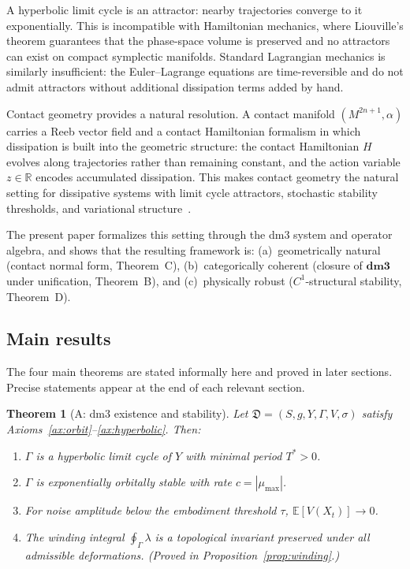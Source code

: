 \documentclass[12pt, oneside]{book}
\theoremstyle{plain}
\newtheorem{theorem}{Theorem}[section]
\theoremstyle{definition}
\theoremstyle{remark}
\newcommand{\R}{\mathbb{R}}
\newcommand{\dm}{\mathfrak{D}}
\newcommand{\dmcat}{\mathbf{dm3}}
\newcommand{\Orb}{\Gamma}
\newcommand{\abs}[1]{\left|#1\right|}
\begin{document}
A hyperbolic limit cycle is an attractor: nearby trajectories converge to it
exponentially. This is incompatible with Hamiltonian mechanics, where
Liouville's theorem guarantees that the phase-space volume is preserved and
no attractors can exist on compact symplectic manifolds. Standard Lagrangian
mechanics is similarly insufficient: the Euler--Lagrange equations are
time-reversible and do not admit attractors without additional dissipation
terms added by hand.

Contact geometry provides a natural resolution. A contact manifold
$(M^{2n+1},\alpha)$ carries a Reeb vector field and a contact Hamiltonian
formalism in which dissipation is built into the geometric structure: the
contact Hamiltonian $H$ evolves along trajectories rather than remaining
constant, and the action variable $z\in\R$ encodes accumulated dissipation.
This makes contact geometry the natural setting for dissipative systems
with limit cycle attractors, stochastic stability thresholds, and
variational structure~\cite{Bravetti2017,deLeonLainz2019}.

The present paper formalizes this setting through the dm3 system and
operator algebra, and shows that the resulting framework is: (a)~geometrically
natural (contact normal form, Theorem~C), (b)~categorically coherent
(closure of $\dmcat$ under unification, Theorem~B), and (c)~physically
robust ($C^1$-structural stability, Theorem~D).

\subsection{Main results}

The four main theorems are stated informally here and proved in later
sections. Precise statements appear at the end of each relevant section.

\begin{theorem}[A: dm3 existence and stability]\label{thm:A}
Let $\dm=(S,g,Y,\Orb,V,\sigma)$ satisfy
Axioms~\ref{ax:orbit}--\ref{ax:hyperbolic}. Then:
\begin{enumerate}[label=\textup{(\roman*)}]
  \item $\Orb$ is a hyperbolic limit cycle of $Y$ with minimal period $T^*>0$.
  \item $\Orb$ is exponentially orbitally stable with rate $c=\abs{\mu_{\max}}$.
  \item For noise amplitude below the embodiment threshold $\tau$,
        $\mathbb{E}[V(X_t)]\to 0$.
  \item The winding integral $\oint_{\Orb}\lambda$ is a topological invariant
        preserved under all admissible deformations.
        \textup{(Proved in Proposition~\ref{prop:winding}.)}
\end{enumerate}
\end{theorem}
\end{document}
